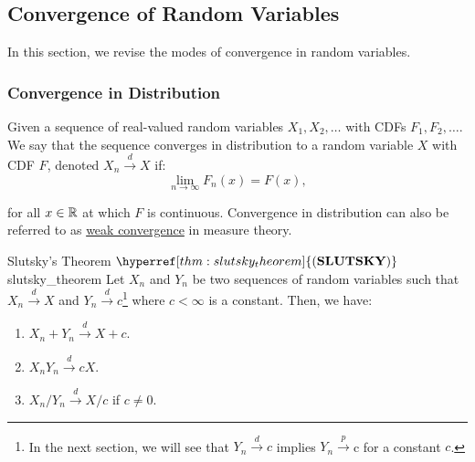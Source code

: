 \subsection{Convergence of Random Variables}
\newcommand{\SLUTSKY}{\hyperref[thm:slutsky_theorem]{(\mathrm{{\bf SLUTSKY}})}}

In this section, we revise the modes of convergence in random variables. 
\subsubsection{Convergence in Distribution}
\begin{definition}
    Given a sequence of real-valued random variables $X_1, X_2, \dots$ with CDFs $F_1, F_2, \dots$. We say that the sequence converges in distribution to a random variable $X$ with CDF $F$, denoted $X_n\xrightarrow{d}X$ if:
    \begin{equation}
        \lim_{n\to\infty}F_n(x) = F(x),
    \end{equation}

    \noindent for all $x\in\mathbb{R}$ at which $F$ is continuous. Convergence in distribution can also be referred to as \underline{weak convergence} in measure theory.
\end{definition}

\begin{theorem}{Slutsky's Theorem $\SLUTSKY$}{slutsky_theorem}
    Let $X_n$ and $Y_n$ be two sequences of random variables such that $X_n\xrightarrow{d}X$ and $Y_n\xrightarrow{d} c$\footnote{In the next section, we will see that $Y_n\xrightarrow{d}c$ implies $Y_n\xrightarrow{p}$c for a constant $c$.} where $c<\infty$ is a constant. Then, we have:
    \begin{enumerate}
        \item $X_n + Y_n \xrightarrow{d} X + c$.
        \item $X_nY_n \xrightarrow{d} cX$.
        \item $X_n/Y_n \xrightarrow{d} X/c$ if $c \ne 0$. 
    \end{enumerate} 
\end{theorem} 

